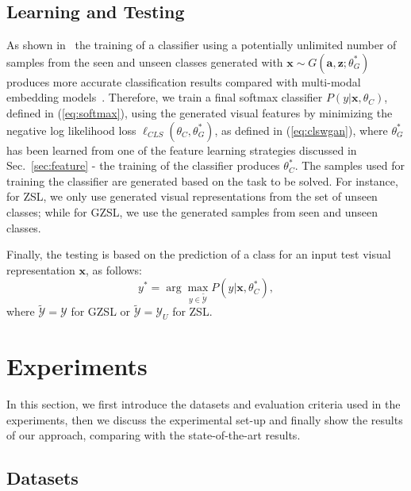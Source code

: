 \documentclass[runningheads]{llncs}
\begin{document}
\subsection{Learning and Testing}
\label{sec:classifier}

As shown in~\cite{XianCVPR2018} the training of a classifier using a potentially unlimited number of samples from the seen and unseen classes generated with $\mathbf{x} \sim G(\mathbf{a},\mathbf{z};\theta_G^*)$ produces more accurate classification results compared with multi-modal embedding models~\cite{akata2016label,frome2013devise,akata2015evaluation,romera2015embarrassingly}.  Therefore, we train a final softmax classifier $P(y|\mathbf{x},\theta_C)$, defined in (\ref{eq:softmax}), using the generated visual features by minimizing the negative log likelihood loss $\ell_{CLS}(\theta_C,\theta^*_G)$, as defined in (\ref{eq:clswgan}), where $\theta_G^*$ has been learned from one of the feature learning strategies discussed in Sec.~\ref{sec:feature} - the training of the classifier produces $\theta^*_C$. The samples used for training the classifier are generated based on the task to be solved.  For instance, for ZSL, we only use generated visual representations from the set of unseen classes; while for GZSL, we use the generated samples from seen and unseen classes.

Finally, the testing is based on the prediction of a class for an input test visual representation $\mathbf{x}$, as follows:
\begin{equation}
y^* = \arg \max_{y \in \widetilde{\mathcal{Y}}} P(y|\mathbf{x},\theta^*_C),
\end{equation}
where $\widetilde{\mathcal{Y}} = \mathcal{Y}$ for GZSL or $\widetilde{\mathcal{Y}} = \mathcal{Y}_U$ for ZSL.

%
%
%
%
%
%
%
\section{Experiments}
\label{sec:experiments}

In this section, we first introduce the datasets and evaluation criteria used in the experiments, then we  discuss the experimental set-up and finally show the results of our approach, comparing with the state-of-the-art results.

%
%
%
%
\subsection{Datasets} 
\label{sec:datasets}
\end{document}
